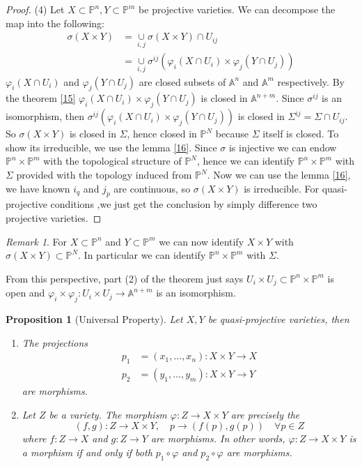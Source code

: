 \documentclass{amsart}
\theoremstyle{plain}
\newtheorem{proposition}{Proposition}
\theoremstyle{definition}
\theoremstyle{remark}
\newtheorem*{remark}{Remark}
\numberwithin{equation}{section}
\begin{document}
\begin{proof}
	(4) Let $ X\subset \mathbb{P}^n,Y\subset \mathbb{P}^m $ be projective varieties. We can decompose the map into the following:
	$$\begin{array}{cc}
		\sigma(X\times Y) &=\mathop{\cup}\limits_{i,j}\sigma(X\times Y)\cap U_{ij}\\
		&=\mathop{\cup}\limits_{i,j}\sigma^{ij}(\varphi_i(X\cap{U_i})\times \varphi_j(Y\cap{U_j}))
	\end{array}$$
	$ \varphi_i(X\cap U_i) $ and $ \varphi_j(Y\cap U_j) $ are closed subsets of $ \mathbb{A}^n $ and $ \mathbb{A}^m $ respectively. By the theorem \ref{15} $ \varphi_i(X\cap{U_i})\times \varphi_j(Y\cap{U_j}) $ is closed in $ \mathbb{A}^{n+m} $. Since $ \sigma^{ij} $ is an isomorphism, then  $ \sigma^{ij}(\varphi_i(X\cap{U_i})\times \varphi_j(Y\cap{U_j})) $ is closed in $ \Sigma^{ij}=\Sigma\cap U_{ij}$. So $ \sigma(X\times Y) $ is closed in $ \Sigma $, hence closed in $ \mathbb{P}^N $ because $ \Sigma $ itself is closed. To show its irreducible, we use the lemma \ref{16}. Since $ \sigma $ is injective we can endow $ \mathbb{P}^n\times\mathbb{P}^m $ with the topological structure of $ \mathbb{P}^N $, hence we can identify $ \mathbb{P}^n\times\mathbb{P}^m $ with $ \Sigma $ provided with the topology induced from $ \mathbb{P}^N $. Now we can use the lemma \ref{16}, we have known $ i_q $ and $ j_p $ are continuous, so $ \sigma(X\times Y) $ is irreducible. For quasi-projective conditions ,we just get the conclusion by simply difference two projective varieties.
\end{proof}
\begin{remark}
For $ X\subset \mathbb{P}^n $ and $ Y\subset\mathbb{P}^m $ we can now identify $ X\times Y $ with $ \sigma(X\times Y)\subset \mathbb{P}^N$. In particular we can identify $ \mathbb{P}^n\times\mathbb{P}^m $ with $ \Sigma $.

From this perspective, part (2) of the theorem just says $ U_i\times U_j\subset \mathbb{P}^n\times \mathbb{P}^m $ is open and $ \varphi_i\times \varphi_j:U_i\times U_j\to \mathbb{A}^{n+m} $ is an isomorphism.
\end{remark}
\begin{proposition}[Universal Property]
	Let $ X,Y $ be quasi-projective varieties, then
	\begin{enumerate}
		\item The projections
			$$\begin{array}{cc}
			p_1 & =(x_1,\dots,x_n): X\times Y\to X\\
			p_2 & =(y_1,\dots,y_m): X\times Y\to Y
			\end{array}$$
			are morphisms.
		\item Let $ Z $ be a variety. The morphism $ \varphi : Z\to X \times Y $ are precisely the
		$$
		(f,g):Z\to X\times Y,\quad p\to (f(p),g(p))\quad\forall p\in Z
		$$
		where $ f:Z\to X $ and $ g:Z\to Y $ are morphisms. In other words, $ \varphi:Z\to X\times Y $ is a morphism if and only if both $ p_1\circ \varphi $ and $ p_2\circ\varphi  $ are morphisms.
	\end{enumerate}
\end{proposition}
\end{document}
